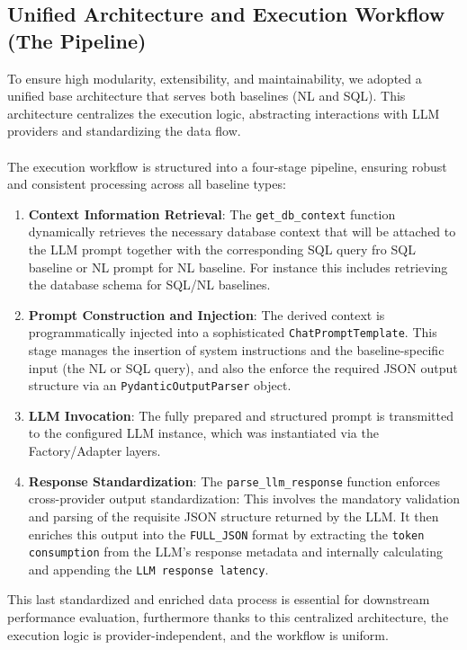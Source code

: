 \subsection{Unified Architecture and Execution Workflow (The Pipeline)}
\label{sec:core_arch}
To ensure high modularity, extensibility, and maintainability, we adopted a unified base architecture that serves both baselines (NL and SQL). This architecture centralizes the execution logic, abstracting interactions with LLM providers and standardizing the data flow.
\\\\
The execution workflow is structured into a four-stage pipeline, ensuring robust and consistent processing across all baseline types:

\begin{enumerate}[leftmargin=*,label=\arabic*.]
    \item \textbf{Context Information Retrieval}: The \texttt{get\_db\_context} function dynamically retrieves the necessary database context that will be attached to the LLM prompt together with the corresponding SQL query fro SQL baseline or NL prompt for NL baseline. For instance this includes retrieving the database schema for SQL/NL baselines.
    \item \textbf{Prompt Construction and Injection}: The derived context is programmatically injected into a sophisticated \texttt{ChatPromptTemplate}. This stage manages the insertion of system instructions and the baseline-specific input (the NL or SQL query), and also the enforce the required JSON output structure via an \texttt{PydanticOutputParser} object.
    \item \textbf{LLM Invocation}: The fully prepared and structured prompt is transmitted to the configured LLM instance, which was instantiated via the Factory/Adapter layers.
    \item \textbf{Response Standardization}: The \texttt{parse\_llm\_response} function enforces cross-provider output standardization: This involves the mandatory validation and parsing of the requisite JSON structure returned by the LLM. It then enriches this output into the \texttt{FULL\_JSON} format by extracting the \texttt{token consumption} from the LLM's response metadata and internally calculating and appending the \texttt{LLM response latency}.
\end{enumerate}
This last standardized and enriched data process is essential for downstream performance evaluation, furthermore thanks to this centralized architecture, the execution logic is provider-independent, and the workflow is uniform.

